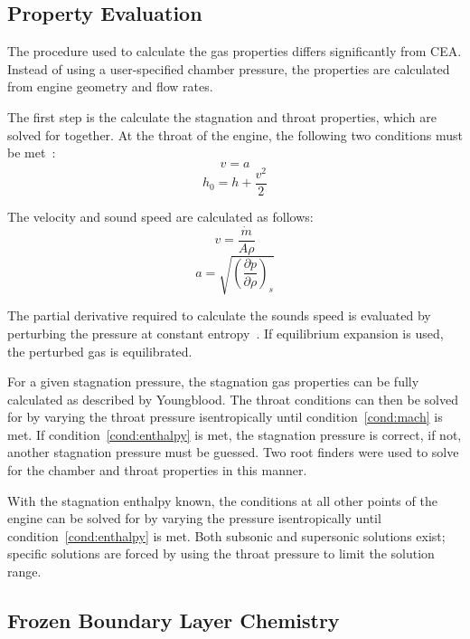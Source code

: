\documentclass[11pt]{article}
\begin{document}
\subsection{Property Evaluation}

The procedure used to calculate the gas properties differs significantly from CEA. Instead of using a user-specified chamber pressure, the properties are calculated from engine geometry and flow rates.

The first step is the calculate the stagnation and throat properties, which are solved for together. At the throat of the engine, the following two conditions must be met~\cite{martinez-sanchez_reacting_????}:
\begin{equation}\label{cond:mach}
  v = a
\end{equation}%
\begin{equation}\label{cond:enthalpy}
  h_0 = h + \frac{v^2}{2}
\end{equation}

The velocity and sound speed are calculated as follows:
\begin{equation}
  v = \frac{\dot{m}}{A \rho}
\end{equation}%
\begin{equation}
  a = \sqrt{\left(\frac{\partial p}{\partial \rho}\right)_s}
\end{equation}

The partial derivative required to calculate the sounds speed is evaluated by perturbing the pressure at constant entropy~\cite{_cantera_????}. If equilibrium expansion is used, the perturbed gas is equilibrated.

For a given stagnation pressure, the stagnation gas properties can be fully calculated as described by Youngblood. The throat conditions can then be solved for by varying the throat pressure isentropically until condition~\ref{cond:mach} is met. If condition~\ref{cond:enthalpy} is met, the stagnation pressure is correct, if not, another stagnation pressure must be guessed. Two root finders were used to solve for the chamber and throat properties in this manner.

With the stagnation enthalpy known, the conditions at all other points of the engine can be solved for by varying the pressure isentropically until condition~\ref{cond:enthalpy} is met. Both subsonic and supersonic solutions exist; specific solutions are forced by using the throat pressure to limit the solution range.


\subsection{Frozen Boundary Layer Chemistry}
\end{document}

